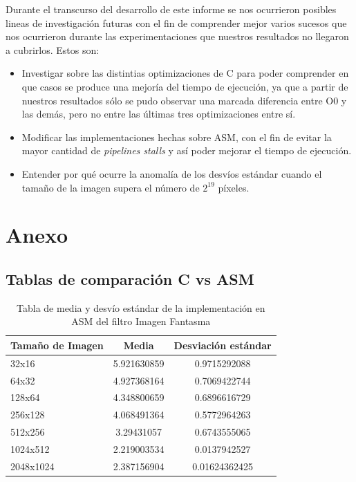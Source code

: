 \documentclass[a4paper]{article}
\begin{document}
\justify
Durante el transcurso del desarrollo de este informe se nos ocurrieron posibles lineas de investigación futuras con el fin de comprender mejor varios sucesos que nos ocurrieron durante las experimentaciones que nuestros resultados no llegaron a cubrirlos. Estos son:
\begin{itemize}
	\item  Investigar sobre las distintias optimizaciones de C para poder comprender en que casos se produce una mejoría del tiempo de ejecución, ya que a partir de nuestros resultados sólo se pudo observar una marcada diferencia entre O0 y las demás, pero no entre las últimas tres optimizaciones entre sí.
	\item Modificar las implementaciones hechas sobre ASM, con el fin de evitar la mayor cantidad de \textit{pipelines stalls} y así poder mejorar el tiempo de ejecución.
	\item Entender por qué ocurre la anomalía de los desvíos estándar cuando el tamaño de la imagen supera el número de $2^{19}$ píxeles.  
\end{itemize}  
\section{Anexo}
\subsection{Tablas de comparación C vs ASM}
\begin{table}[h!]
	\begin{center}
		\begin{tabular}{| l | c | c |}
			\hline
			Tamaño de Imagen & Media & Desviación estándar \\ \hline
			32x16	 & 5.921630859 &	0.9715292088 \\
			64x32	 & 4.927368164 & 0.7069422744 \\
			128x64	 & 4.348800659 & 0.6896616729 \\
			256x128	 & 4.068491364	& 0.5772964263 \\
			512x256	 & 3.29431057	& 0.6743555065 \\
			1024x512 & 2.219003534	& 0.0137942527 \\
			2048x1024 &	2.387156904	& 0.01624362425 \\ \hline
		\end{tabular}
		\caption{Tabla de media y desvío estándar de la implementación en ASM del filtro Imagen Fantasma}
	\end{center}
\end{table}
\end{document}
